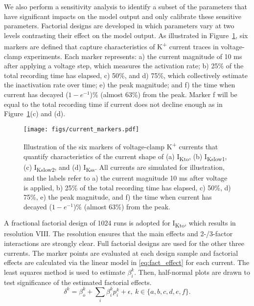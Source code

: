 \documentclass[11pt]{article}
\begin{document}
We also perform a sensitivity analysis to identify a subset of the parameters that have significant impacts on the model output and only calibrate these sensitive parameters. Factorial designs are developed in which parameters vary at two levels contrasting their effect on the model output. As illustrated in Figure~\ref{fig:current_markers}, six markers are defined that capture characteristics of K\textsuperscript{+} current traces in voltage-clamp experiments. Each marker represents: a) the current magnitude of 10 ms after applying a voltage step, which measures the activation rate; b) 25\% of the total recording time has elapsed, c) 50\%, and d) 75\%, which collectively estimate the inactivation rate over time; e) the peak magnitude; and f) the time when current has decayed ($1-e^{-1}$)\% (almost 63\%) from the peak. Marker f will be equal to the total recording time if current does not decline enough as in Figure~\ref{fig:current_markers}(c) and (d).
\begin{figure}[!ht]
    \centering
    \texttt{[image: figs/current\_markers.pdf]}
    \caption{Illustration of the six markers of voltage-clamp K\textsuperscript{+} currents that quantify characteristics of the current shape of (a) I\textsubscript{Kto}, (b) I\textsubscript{Kslow1}, (c) I\textsubscript{Kslow2}, and (d) I\textsubscript{Kss}. All currents are simulated for illustration, and the labels refer to a) the current magnitude 10 ms after voltage is applied, b) 25\% of the total recording time has elapsed, c) 50\%, d) 75\%, e) the peak magnitude, and f) the time when current has decayed ($1-e^{-1}$)\% (almost 63\%) from the peak.}
    \label{fig:current_markers}
\end{figure}

A fractional factorial design of 1024 runs is adopted for I\textsubscript{Kto}, which results in resolution VIII. The resolution ensures that the main effects and 2-/3-factor interactions are strongly clear. Full factorial designs are used for the other three currents. The marker points are evaluated at each design sample and factorial effects are calculated via the linear model in \eqref{eq:fact_effect} for each current. The least squares method is used to estimate $\beta_{i}^{k}$. Then, half-normal plots are drawn to test significance of the estimated factorial effects. 
\begin{equation}
    \label{eq:fact_effect}
    \delta^{k} = \beta_{o}^{k} + \sum\limits_{i}\beta_{i}^{k}p_{i}^{k} + \epsilon, \ k \in \{a,b,c,d,e,f\}.
\end{equation}
\end{document}
